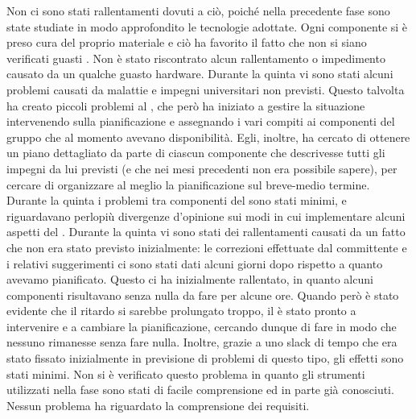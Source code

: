 		Non ci sono stati rallentamenti dovuti a ciò, poiché nella precedente fase sono state studiate in modo approfondito le tecnologie adottate.
		Ogni componente si è preso cura del proprio materiale e ciò ha favorito il fatto che non si siano verificati guasti . Non è stato riscontrato alcun rallentamento o impedimento causato da un qualche guasto hardware.
		Durante la quinta  vi sono stati alcuni problemi causati da malattie e impegni universitari non previsti. Questo talvolta ha creato piccoli problemi al , che però ha iniziato a gestire la situazione intervenendo sulla pianificazione e assegnando i vari compiti ai componenti del gruppo che al momento avevano disponibilità. Egli, inoltre, ha cercato di ottenere un piano dettagliato da parte di ciascun componente che descrivesse tutti gli impegni da lui previsti (e che nei mesi precedenti non era possibile sapere), per cercare di organizzare al meglio la pianificazione sul breve-medio termine.
		Durante la quinta  i problemi tra componenti del  sono stati minimi, e riguardavano perlopiù divergenze d'opinione sui modi in cui implementare alcuni aspetti del .
		Durante la quinta  vi sono stati dei rallentamenti causati da un fatto che non era stato previsto inizialmente: le correzioni effettuate dal committente e i relativi suggerimenti ci sono stati dati alcuni giorni dopo rispetto a quanto avevamo pianificato. Questo ci ha inizialmente rallentato, in quanto alcuni componenti risultavano senza nulla da fare per alcune ore. Quando però è stato evidente che il ritardo si sarebbe prolungato troppo, il  è stato pronto a intervenire e a cambiare la pianificazione, cercando dunque di fare in modo che nessuno rimanesse senza fare nulla. Inoltre, grazie a uno slack di tempo che era stato fissato inizialmente in previsione di problemi di questo tipo, gli effetti sono stati minimi.
		Non si è verificato questo problema in quanto gli strumenti utilizzati nella fase sono stati di facile comprensione ed in parte già conosciuti.
		Nessun problema ha riguardato la comprensione dei requisiti.

